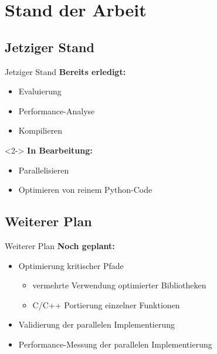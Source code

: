 \section{Stand der Arbeit}

\subsection{Jetziger Stand}
\begin{frame}{Jetziger Stand}
	\textbf{Bereits erledigt:}
	\begin{itemize}
		\item Evaluierung
		\item Performance-Analyse
		\item Kompilieren
	\end{itemize}
	
	\begin{uncoverenv}<2->
		\textbf{In Bearbeitung:}
		\begin{itemize}
			\item Parallelisieren
			\item Optimieren von reinem Python-Code
		\end{itemize}
	\end{uncoverenv}
\end{frame}

\subsection{Weiterer Plan}
\begin{frame}{Weiterer Plan}
\textbf{Noch geplant:}
\begin{itemize}
	\item Optimierung kritischer Pfade
	\begin{itemize}
		\item vermehrte Verwendung optimierter Bibliotheken
		\item C/C++ Portierung einzelner Funktionen
	\end{itemize}
	\item Validierung der parallelen Implementierung
	\item Performance-Messung der parallelen Implementierung
\end{itemize}
\end{frame}


